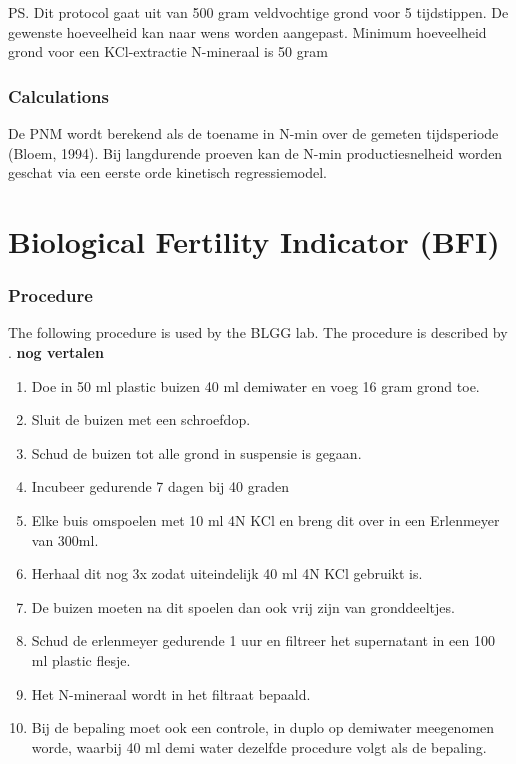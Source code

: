 \documentclass[10pt,twoside,dutch,english]{report}
\begin{document}
\begin{appendices}
\begin{enumerate}
\end{enumerate}
PS. Dit protocol gaat uit van 500 gram veldvochtige grond voor 5 tijdstippen. De gewenste hoeveelheid kan naar 
wens worden aangepast. Minimum hoeveelheid grond voor een KCl-extractie N-mineraal is 50 gram

\subsubsection{Calculations}
De PNM wordt berekend als de toename in N-min over de gemeten tijdsperiode (Bloem, 1994). Bij langdurende 
proeven kan de N-min productiesnelheid worden geschat via een eerste orde kinetisch regressiemodel. 

\section{Biological Fertility Indicator (BFI)}
\subsubsection{Procedure}
The following procedure is used by the BLGG lab. The procedure is described by \citet{Hanegraaf2008}. \textbf{nog vertalen}

\begin{enumerate}
\item  Doe in 50 ml plastic buizen 40 ml demiwater en voeg 16 gram grond toe. 
\item  Sluit de buizen met een schroefdop.
\item Schud de buizen tot alle grond in suspensie is gegaan.
\item Incubeer gedurende 7 dagen bij 40 graden
\item Elke buis omspoelen met 10 ml 4N KCl en breng dit over in een Erlenmeyer van 300ml.
\item Herhaal dit nog 3x zodat uiteindelijk 40 ml 4N KCl gebruikt is. 
\item De buizen moeten na dit spoelen dan ook vrij zijn van gronddeeltjes.
\item Schud de erlenmeyer gedurende 1 uur en filtreer het supernatant in een 100 ml plastic flesje.
\item Het N-mineraal wordt in het filtraat bepaald.  
\item Bij de bepaling moet ook een controle, in duplo op demiwater meegenomen worde, waarbij 40 ml demi water dezelfde procedure volgt als de bepaling.
\end{enumerate}


\end{appendices}
\end{document}
